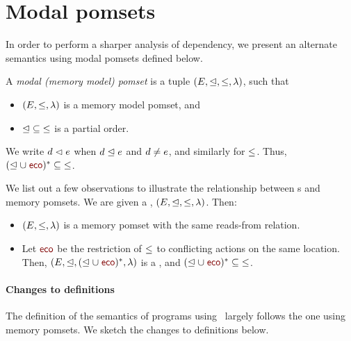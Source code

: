 
\section{Modal pomsets}
In order to perform a sharper analysis of dependency, we present an alternate semantics using modal pomsets defined below.
\begin{definition}
  A \emph{modal (memory model) pomset} is a tuple
  $(E, {\trianglelefteq}, {\leq},
  \lambda)$, such that
  \begin{itemize}
   \item $(E, {\leq},
  \lambda)$ is a memory model pomset, and 
\item ${\trianglelefteq} \subseteq {\leq}$ is a partial order. 
  \end{itemize}
\end{definition}
We write $d\vartriangleleft e$ when $d\trianglelefteq e$ and $d\neq e$, and similarly for $\leq$.   Thus, $(\sle \cup \reco)^{*} \subseteq {\gtN}$.  

We list out a few observations to illustrate the relationship between \tvalpom s and memory pomsets.  We are given a  \tvalpom, 
  $(E, {\trianglelefteq}, {\leq}, \lambda)$.  Then:
\begin{itemize}
\item $(E, {\leq},\lambda)$ is a memory pomset with the same reads-from relation.  

\item Let $\reco$ be the restriction of $\leq$ to conflicting actions on the same location.  Then, $(\Event, {\sle}, (\sle \cup \reco)^{*}, \labeling)$ is a \tvalpom, and $(\sle \cup \reco)^{*} \subseteq {\gtN}$.
\end{itemize}

\paragraph*{Changes to definitions}
The definition of the semantics of programs using \tvalpom\ largely follows the one using memory pomsets.  We sketch the changes to definitions below.

